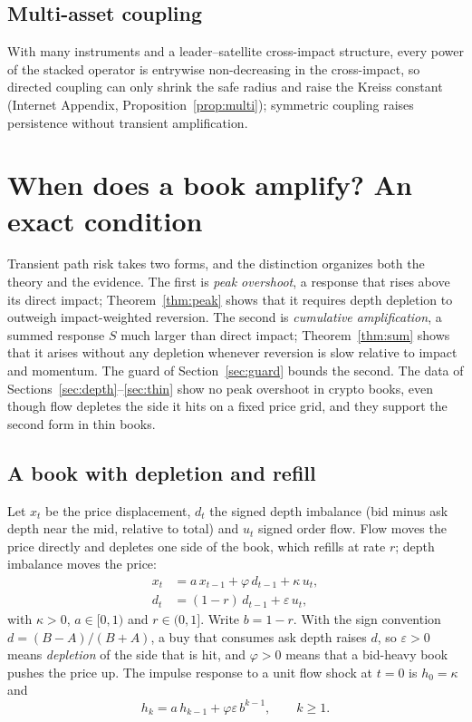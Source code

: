 \documentclass[12pt]{article}
\theoremstyle{definition}
\theoremstyle{remark}
\begin{document}
\subsection{Multi-asset coupling}
With many instruments and a leader--satellite cross-impact structure, every power of the stacked operator is entrywise non-decreasing in the cross-impact, so directed coupling can only shrink the safe radius and raise the Kreiss constant (Internet Appendix, Proposition~\ref{prop:multi}); symmetric coupling raises persistence without transient amplification.

\section{When does a book amplify? An exact condition}\label{sec:t6}

Transient path risk takes two forms, and the distinction organizes both the theory and the evidence. The first is \emph{peak overshoot}, a response that rises above its direct impact; Theorem~\ref{thm:peak} shows that it requires depth depletion to outweigh impact-weighted reversion. The second is \emph{cumulative amplification}, a summed response $S$ much larger than direct impact; Theorem~\ref{thm:sum} shows that it arises without any depletion whenever reversion is slow relative to impact and momentum. The guard of Section~\ref{sec:guard} bounds the second. The data of Sections~\ref{sec:depth}--\ref{sec:thin} show no peak overshoot in crypto books, even though flow depletes the side it hits on a fixed price grid, and they support the second form in thin books.

\subsection{A book with depletion and refill}
Let $x_t$ be the price displacement, $d_t$ the signed depth imbalance (bid minus ask depth near the mid, relative to total) and $u_t$ signed order flow. Flow moves the price directly and depletes one side of the book, which refills at rate $r$; depth imbalance moves the price:
\begin{align}
x_t &= a\,x_{t-1} + \varphi\,d_{t-1} + \kappa\,u_t, \label{eq:x}\\
d_t &= (1-r)\,d_{t-1} + \varepsilon\,u_t, \label{eq:d}
\end{align}
with $\kappa>0$, $a\in[0,1)$ and $r\in(0,1]$. Write $b=1-r$. With the sign convention $d=(B-A)/(B+A)$, a buy that consumes ask depth raises $d$, so $\varepsilon>0$ means \emph{depletion} of the side that is hit, and $\varphi>0$ means that a bid-heavy book pushes the price up. The impulse response to a unit flow shock at $t=0$ is $h_0=\kappa$ and
\begin{equation}\label{eq:rec}
h_k=a\,h_{k-1}+\varphi\varepsilon\,b^{k-1},\qquad k\ge1.
\end{equation}
\end{document}
